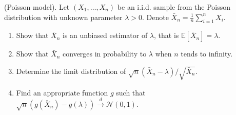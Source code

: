 \begin{Exercise}
  (Poisson model). Let $\left(X_{1}, \ldots, X_{n}\right)$ be an i.i.d. sample from the Poisson distribution with unknown parameter $\lambda>0$. Denote $\bar{X}_{n}=\frac{1}{n} \sum_{i=1}^{n} X_{i}$.

  \begin{enumerate}
    \item Show that $\bar{X}_{n}$ is an unbiased estimator of $\lambda$, that is
          $\mathbb{E}\left[\bar{X}_{n}\right]=\lambda$.

    \item Show that $\bar{X}_{n}$ converges in probability to $\lambda$ when $n$ tends to
          infinity.

    \item Determine the limit distribution of $\sqrt{n}\left(\bar{X}_{n}-\lambda\right) /
            \sqrt{\bar{X}_{n}}$.

    \item Find an appropriate function $g$ such that
          $\sqrt{n}\left(g\left(\bar{X}_{n}\right)-g(\lambda)\right)
            \stackrel{d}{\longrightarrow} \mathcal{N}(0,1)$.

  \end{enumerate}
\end{Exercise}

